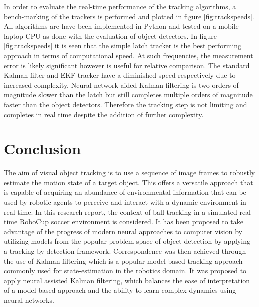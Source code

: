 \documentclass[a4paper,twoside,12pt]{report}
\begin{document}
In order to evaluate the real-time performance of the tracking algorithms, a bench-marking of the trackers is performed and plotted in figure \ref{fig:trackspeeds}. All algorithms are have been implemented in Python and tested on a mobile laptop CPU as done with the evaluation of object detectors. In figure \ref{fig:trackspeeds} it is seen that the simple latch tracker is the best performing approach in terms of computational speed. At such frequencies, the measurement error is likely significant however is useful for relative comparison. The standard Kalman filter and EKF tracker have a diminished speed respectively due to increased complexity. Neural network aided Kalman filtering is two orders of magnitude slower than the latch but still completes multiple orders of magnitude faster than the object detectors. Therefore the tracking step is not limiting and completes in real time despite the addition of further complexity. 

\chapter{Conclusion}

The aim of visual object tracking is to use a sequence of image frames to robustly estimate the motion state of a target object. This offers a versatile approach that is capable of acquiring an abundance of environmental information that can be used by robotic agents to perceive and interact with a dynamic environment in real-time. In this research report, the context of ball tracking in a simulated real-time RoboCup soccer environment is considered. It has been proposed to take advantage of the progress of modern neural approaches to computer vision by utilizing models from the popular problem space of object detection by applying a tracking-by-detection framework. Correspondence was then achieved through the use of Kalman filtering which is a popular model based tracking approach commonly used for state-estimation in the robotics domain. It was proposed to apply neural assisted Kalman filtering, which balances the ease of interpretation of a model-based approach and the ability to learn complex dynamics using neural networks. 
\end{document}
